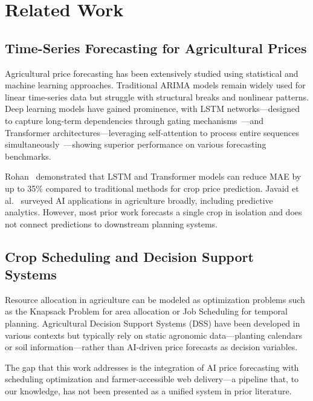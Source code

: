 \documentclass[conference]{IEEEtran}
\begin{document}
\section{Related Work}

\subsection{Time-Series Forecasting for Agricultural Prices}

Agricultural price forecasting has been extensively studied using statistical and machine learning approaches. Traditional ARIMA models remain widely used for linear time-series data but struggle with structural breaks and nonlinear patterns. Deep learning models have gained prominence, with LSTM networks---designed to capture long-term dependencies through gating mechanisms~\cite{hochreiter1997lstm}---and Transformer architectures---leveraging self-attention to process entire sequences simultaneously~\cite{vaswani2017attention}---showing superior performance on various forecasting benchmarks.

Rohan~\cite{rohan2025crop} demonstrated that LSTM and Transformer models can reduce MAE by up to 35\% compared to traditional methods for crop price prediction. Javaid et al.~\cite{javaid2023ai} surveyed AI applications in agriculture broadly, including predictive analytics. However, most prior work forecasts a single crop in isolation and does not connect predictions to downstream planning systems.

\subsection{Crop Scheduling and Decision Support Systems}

Resource allocation in agriculture can be modeled as optimization problems such as the Knapsack Problem for area allocation or Job Scheduling for temporal planning. Agricultural Decision Support Systems (DSS) have been developed in various contexts but typically rely on static agronomic data---planting calendars or soil information---rather than AI-driven price forecasts as decision variables.

The gap that this work addresses is the integration of AI price forecasting with scheduling optimization and farmer-accessible web delivery---a pipeline that, to our knowledge, has not been presented as a unified system in prior literature.

\end{document}
